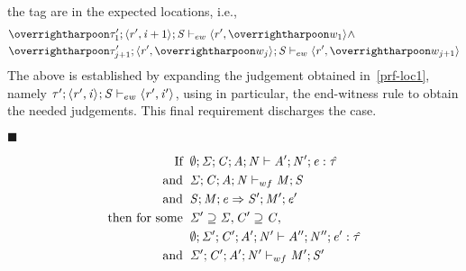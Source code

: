 \begin{nproof}
\begin{bcase}
    the tag are in the expected locations, i.e.,
        \begin{align*}
    & \ewitness{\overharpoon{\TYP'_{1}}}{\concreteloc{\reg'}{\ind + 1}{}}{\STOR}{\concreteloc{\reg'}{\overharpoon{w_1}}{}} \wedge \\
    & \ewitness{\overharpoon{\TYP'_{j+1}}}{\concreteloc{\reg'}{\overharpoon{w_j}}{}}{\STOR}{\concreteloc{\reg'}{\overharpoon{w_{j+1}}}{}}
    \end{align*}
    The above is established by expanding the judgement obtained in~\ref{prf-loc1}, namely
    $\mathit{\tau}';\langle \mathit{r}', \mathit{i} \rangle ^{};\mathit{S} \vdash_{ew} \langle \mathit{r}', \mathit{i}' \rangle ^{}$,
    using in particular, the end-witness rule
     to obtain the
    needed judgements.
    This final requirement discharges the case.
  \end{bcase}

$\blacksquare$

\end{nproof}

\begin{lemma}[Preservation]
  \label{lemma:preservation}
  \begin{displaymath}
    \begin{aligned}
      \text{If} \;\; & \emptyset;\mathit{\Sigma};\mathit{C};\mathit{A};\mathit{N} \vdash \mathit{A}';\mathit{N}';\mathit{e} : \mathit{\hat{\tau}} \\
      \text{and} \;\; & \mathit{\Sigma};\mathit{C};\mathit{A};\mathit{N} \vdash_{wf} \mathit{M};\mathit{S}\\
      \text{and} \;\; & \mathit{S};\mathit{M};\mathit{e} \Rightarrow \mathit{S}';\mathit{M}';\mathit{e}' \\
      \text{then for some} \;\; & \mathit{\Sigma}' \supseteq \mathit{\Sigma}, \mathit{C}' \supseteq \mathit{C} ,\\
      & \emptyset;\mathit{\Sigma}';\mathit{C}';\mathit{A}';\mathit{N}' \vdash \mathit{A}'';\mathit{N}'';\mathit{e}' : \mathit{\hat{\tau}} \\
      \text{and} \;\; & \mathit{\Sigma}';\mathit{C}';\mathit{A}';\mathit{N}' \vdash_{wf} \mathit{M}';\mathit{S}'\\
    \end{aligned}
  \end{displaymath}
\end{lemma}

